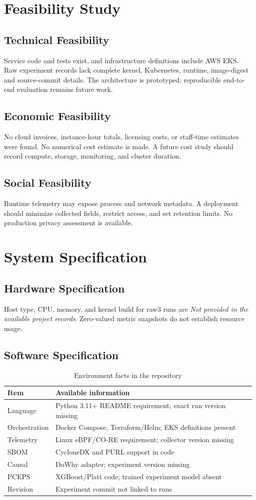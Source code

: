 \documentclass[12pt,a4paper,oneside]{report}
\newcommand{\notprovided}{\textit{Not provided in the available project records}}
\begin{document}
\section{Feasibility Study}
\subsection{Technical Feasibility}
Service code and tests exist, and infrastructure definitions include AWS EKS. Raw experiment records lack complete kernel, Kubernetes, runtime, image-digest and source-commit details. The architecture is prototyped; reproducible end-to-end evaluation remains future work.
\subsection{Economic Feasibility}
No cloud invoices, instance-hour totals, licensing costs, or staff-time estimates were found. No numerical cost estimate is made. A future cost study should record compute, storage, monitoring, and cluster duration.
\subsection{Social Feasibility}
Runtime telemetry may expose process and network metadata. A deployment should minimize collected fields, restrict access, and set retention limits. No production privacy assessment is available.
\section{System Specification}
\subsection{Hardware Specification}
Host type, CPU, memory, and kernel build for raw3 runs are \notprovided. Zero-valued metric snapshots do not establish resource usage.
\subsection{Software Specification}
\begin{table}[htbp]\centering\caption{Environment facts in the repository}\label{tab:software}\begin{tabularx}{\textwidth}{p{1.6in}X}\toprule Item&Available information\\\midrule Language&Python 3.11+ README requirement; exact run version missing\\Orchestration&Docker Compose, Terraform/Helm; EKS definitions present\\Telemetry&Linux eBPF/CO-RE requirement; collector version missing\\SBOM&CycloneDX and PURL support in code\\Causal&DoWhy adapter; experiment version missing\\PCEPS&XGBoost/Platt code; trained experiment model absent\\Revision&Experiment commit not linked to runs\\\bottomrule\end{tabularx}\end{table}
\end{document}
